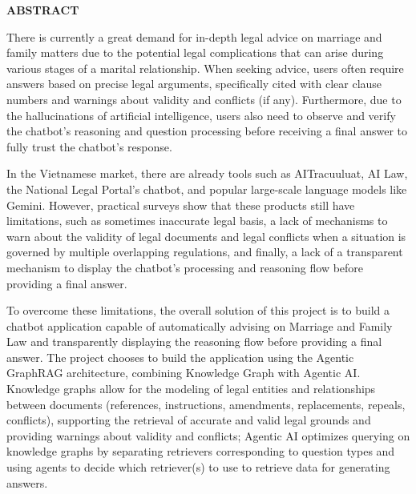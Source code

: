 \documentclass[../DoAn.tex]{subfiles}
\begin{document}
\begin{center}
    \Large{\textbf{ABSTRACT}}\\
\end{center}
\vspace{1cm}
There is currently a great demand for in-depth legal advice on marriage and family matters due to the potential legal complications that can arise during various stages of a marital relationship. When seeking advice, users often require answers based on precise legal arguments, specifically cited with clear clause numbers and warnings about validity and conflicts (if any). Furthermore, due to the hallucinations of artificial intelligence, users also need to observe and verify the chatbot's reasoning and question processing before receiving a final answer to fully trust the chatbot's response.

In the Vietnamese market, there are already tools such as AITracuuluat, AI Law, the National Legal Portal's chatbot, and popular large-scale language models like Gemini. However, practical surveys show that these products still have limitations, such as sometimes inaccurate legal basis, a lack of mechanisms to warn about the validity of legal documents and legal conflicts when a situation is governed by multiple overlapping regulations, and finally, a lack of a transparent mechanism to display the chatbot's processing and reasoning flow before providing a final answer.

To overcome these limitations, the overall solution of this project is to build a chatbot application capable of automatically advising on Marriage and Family Law and transparently displaying the reasoning flow before providing a final answer. The project chooses to build the application using the Agentic GraphRAG architecture, combining Knowledge Graph with Agentic AI. Knowledge graphs allow for the modeling of legal entities and relationships between documents (references, instructions, amendments, replacements, repeals, conflicts), supporting the retrieval of accurate and valid legal grounds and providing warnings about validity and conflicts; Agentic AI optimizes querying on knowledge graphs by separating retrievers corresponding to question types and using agents to decide which retriever(s) to use to retrieve data for generating answers.
\end{document}
